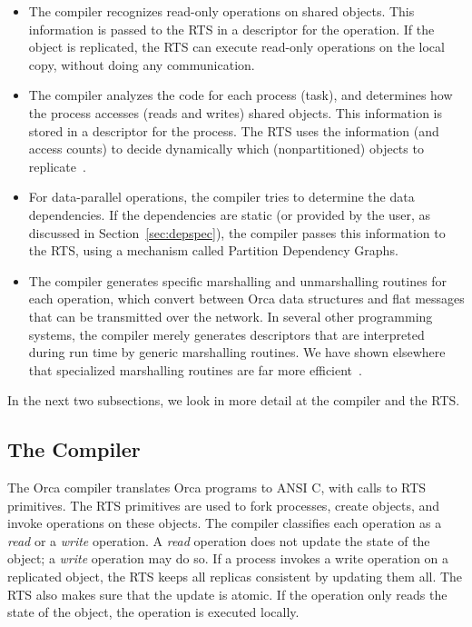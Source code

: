 \documentclass{acmtrans2e}
\begin{document}
\begin{itemize}

\item The compiler recognizes read-only operations on shared objects.
This information is passed to the RTS in a descriptor
for the operation.  If the object is replicated, the RTS can
execute read-only operations on the local copy, without doing
any communication.

\item The compiler analyzes the code for each process (task), and determines
how the process accesses (reads and writes) shared objects.
This information is stored in a descriptor for the process.
The RTS uses the information (and access counts)
to decide dynamically which (nonpartitioned) objects
to replicate~\cite{Bal:1998}.

\item For data-parallel operations, the compiler tries to determine
the data dependencies. If the dependencies are static (or
provided by the user, as discussed in Section~\ref{sec:depspec}),
the compiler passes this information to the RTS, using a
mechanism called Partition Dependency Graphs.

\item The compiler generates specific marshalling and unmarshalling routines
for each operation, which convert between Orca data structures
and flat messages that can be transmitted over the network.
In several other programming systems, the compiler merely
generates descriptors that are interpreted during run time
by generic marshalling routines. We have shown elsewhere
that specialized marshalling routines are far more
efficient~\cite{bal97}.

\end{itemize}

In the next two subsections, we look in more detail at
the compiler and the RTS.

\subsection{The Compiler}
\label{sec:compiler}

The Orca compiler translates Orca programs to ANSI C, with calls to
RTS primitives. The RTS primitives are used to fork processes, create
objects, and invoke operations on these objects.  The compiler
classifies each operation as a {\em read} or a {\em write} operation.
A {\em read}
operation does not update the state of the object; a {\em write}
operation may do so.  If a process invokes a write operation on a
replicated object, the RTS keeps all replicas consistent by updating
them all. The RTS also makes sure that the update is atomic. If the
operation only reads the state of the object, the operation is
executed locally.
\end{document}
